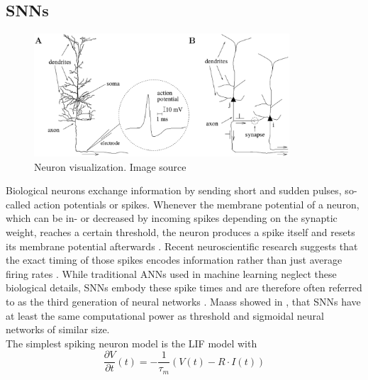 \subsection{\aclp{SNN}}
\label{subsec:SNN}
\begin{figure}
	\centering
	\includegraphics[width=0.85\textwidth]{imgs/Neuron_model.eps}
	\caption{Neuron visualization. Image source \cite{Gerstner2002}}
	\label{fig:biological_neuron}
\end{figure}
Biological neurons exchange information by sending short and sudden pulses, so-called action potentials or spikes.
Whenever the membrane potential of a neuron, which can be in- or decreased by incoming spikes depending on the synaptic weight, reaches a certain threshold, the neuron produces a spike itself and resets its membrane potential afterwards \cite{Gerstner2002, Paugam2009}.
Recent neuroscientific research suggests that the exact timing of those spikes encodes information rather than just average firing rates \cite{Bohte2004}.
While traditional \acp{ANN} used in machine learning neglect these biological details, \acp{SNN} embody these spike times and are therefore often referred to as the third generation of neural networks \cite{Maass1997, Paugam2009}.
Maass showed in \cite{Maass1997}, that \acp{SNN} have at least the same computational power as threshold and sigmoidal neural networks of similar size.\\
The simplest spiking neuron model is the \acf{LIF} model with 
\begin{equation}
\frac{\partial V}{\partial t}(t) = - \frac{1}{\tau_{m}} \left( V\left(t\right) - R \cdot I\left(t\right) \right)
\label{eq:LIF}
\end{equation}

